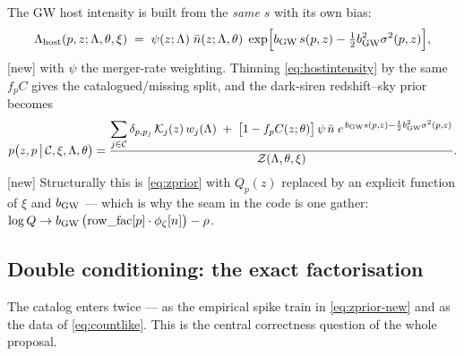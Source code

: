 The GW host intensity is built from the \emph{same} $s$ with its own bias:
\begin{equation}
  \Lambda_{\rm host}(p,z;\Lambda,\theta,\xi)
  \;=\;\psi(z;\Lambda)\;\bar n(z;\Lambda,\theta)\;
  \exp\!\Big[b_{\rm GW}\,s(p,z)-\tfrac12 b_{\rm GW}^2\sigma^2(p,z)\Big],
  \label{eq:hostintensity}
\end{equation}
\hfill[new]
with $\psi$ the merger-rate weighting.  Thinning \eqref{eq:hostintensity} by
the same $f_pC$ gives the catalogued/missing split, and the dark-siren
redshift--sky prior becomes
\begin{equation}
  p\big(z,p\,\big|\,\mathcal C,\xi,\Lambda,\theta\big)
  =\frac{\displaystyle\sum_{j\in\mathcal C}\delta_{p,p_j}\,\mathcal K_j(z)\,w_j(\Lambda)
        \;+\;\big[1-f_pC(z;\theta)\big]\,\psi\,\bar n\;
        e^{\,b_{\rm GW}s(p,z)-\frac12 b_{\rm GW}^2\sigma^2(p,z)}}
       {\mathcal Z(\Lambda,\theta,\xi)} .
  \label{eq:zprior-new}
\end{equation}
\hfill[new]
Structurally this is \eqref{eq:zprior} with $Q_p(z)$ replaced by an explicit
function of $\xi$ and $b_{\rm GW}$ --- which is why the seam in the code is one
gather: $\log Q\to b_{\rm GW}\,\big(\mathrm{row\_fac}[p]\cdot\phi_\zeta[n]\big)-\rho$.

\subsection{Double conditioning: the exact factorisation}
\label{sec:double}

The catalog enters twice --- as the empirical spike train in
\eqref{eq:zprior-new} and as the data of \eqref{eq:countlike}.  This is the
central correctness question of the whole proposal.


